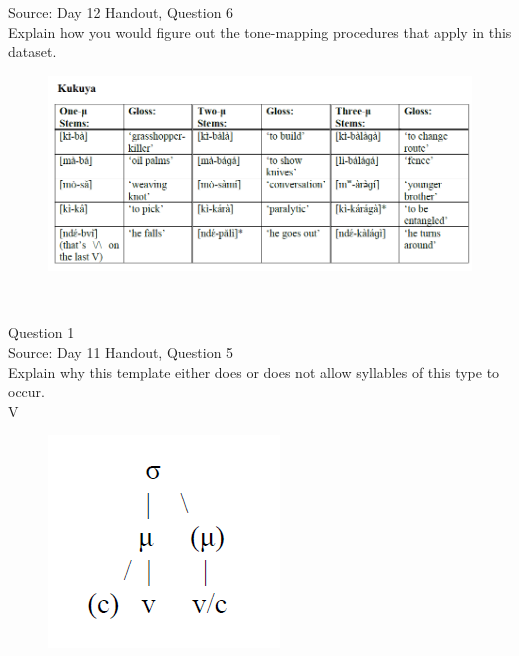 \documentclass[12pt]{article}
\begin{document}
Source: Day 12 Handout, Question 6\\

Explain how you would figure out the tone-mapping procedures that apply in this dataset.\\

\begin{figure}[H]
\includegraphics{../images/kukuya.png}
\end{figure}

\newpage

\begin{center}
\textbf{{\color{red}{\HUGE END OF EXAM}}}\\

\end{center}
\newpage

\begin{center}
\textbf{{\color{blue}{\HUGE START OF EXAM\\}}}

\textbf{{\color{blue}{\HUGE Student ID: 9303\\}}}

\textbf{{\color{blue}{\HUGE 10:30 - 10:50 AM\\}}}

\end{center}
\newpage

{\large Question 1}\\

Source: Day 11 Handout, Question 5\\

Explain why this template either does or does not allow syllables of this type to occur.\\

V

\begin{figure}[H]
\includegraphics{../images/ponapean_syllabletemplate.png}
\end{figure}
\end{document}
